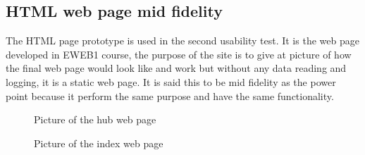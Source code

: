 \subsection{HTML web page mid fidelity}
The HTML page prototype is used in the second usability test. It is the web page developed in EWEB1 course, the purpose of the site is to give at picture of how the final web page would look like and work but without any data reading and logging, it is a static web page. It is said this to be mid fidelity as the power point because it perform the same purpose and have the same functionality.
\begin{figure}[H]
	\center
		\setlength\fboxsep{0pt}
		\setlength\fboxrule{1pt}
   	\caption{Picture of the hub web page}
   	\label{fig:web_hub_interface}
\end{figure}
\begin{figure}[H]
	\center
		\setlength\fboxsep{0pt}
		\setlength\fboxrule{1pt}
   	\caption{Picture of the index web page}
   	\label{fig:web_index_interface}
\end{figure}

